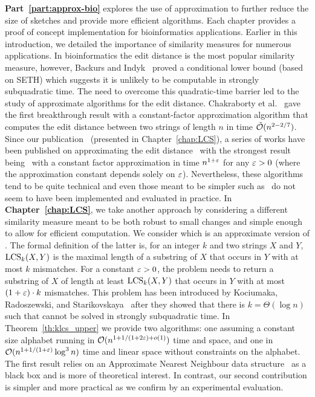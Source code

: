 \textbf{Part~\ref{part:approx-bio}} explores the use of approximation to further reduce the size of sketches and provide more efficient algorithms. Each chapter provides a proof of concept implementation for bioinformatics applications.
%
Earlier in this introduction, we detailed the importance of similarity measures for numerous applications.
In bioinformatics the edit distance is the most popular similarity measure, however, Backurs and Indyk~\cite{DBLP:conf/stoc/BackursI15} proved a conditional lower bound (based on SETH) which suggests it is unlikely to be computable in strongly subquadratic time.
The need to overcome this quadratic-time barrier led to the study of approximate algorithms for the edit distance. Chakraborty et al.~\cite{DBLP:conf/focs/ChakrabortyDGKS18} gave the first breakthrough result with a constant-factor approximation algorithm that computes the edit distance between two strings of length $n$ in time $\tilde{\mathcal{O}}(n^{2-2/7})$.
Since our publication~\cite{DBLP:conf/cpm/GourdelKRS20} (presented in Chapter~\ref{chap:LCS}), a series of works have been published on approximating the edit distance~\cite{brakensiek2020constant,koucky2020constant} with the strongest result being~\cite{andoni2020edit} with a constant factor approximation in time $n^{1+\varepsilon}$ for any $\varepsilon>0$ (where the approximation constant depends solely on $\varepsilon$).
Nevertheless, these algorithms tend to be quite technical and even those meant to be simpler such as~\cite{andoni2020simple} do not seem to have been implemented and evaluated in practice.
In \textbf{Chapter~\ref{chap:LCS}}, we take another approach by considering a different similarity measure meant to be both robust to small changes and simple enough to allow for efficient computation. We consider \kApproxLCS which is an approximate version of \kLCS. The formal definition of the latter is, for an integer $k$ and two strings $X$ and $Y$, $\mathrm{LCS}_{k}(X,Y)$ is the maximal length of a substring of $X$ that occurs in $Y$ with at most $k$ mismatches.
For a constant $\varepsilon > 0$, the \kApproxLCS problem needs to return a substring of $X$ of length at least $\mathrm{LCS}_{k}(X,Y)$ that occurs in $Y$ with at most $(1+\varepsilon) \cdot k$ mismatches. This problem has been introduced by Kociumaka, Radoszewski, and Starikovskaya~\cite{DBLP:journals/algorithmica/KociumakaRS19} after they showed that there is $k=\Theta(\log n)$ such that \kLCS cannot be solved in strongly subquadratic time.
In Theorem~\ref{th:klcs_upper} we provide two algorithms: one assuming a constant size alphabet running in $\mathcal{O}(n^{1+ 1/(1+2\varepsilon) + o(1)})$ time and space, and one in $\mathcal{O}(n^{1+1/(1+\varepsilon)} \log^3 n)$ time and linear space without constraints on the alphabet. The first result relies on an Approximate Nearest Neighbour data structure~\cite{DBLP:conf/stoc/AndoniR15} as a black box and is more of theoretical interest. In contrast, our second contribution is simpler and more practical as we confirm by an experimental evaluation.
